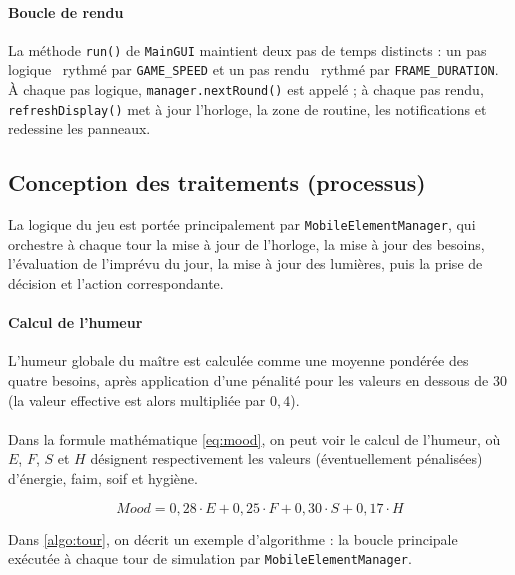 
\paragraph{Boucle de rendu} La méthode \texttt{run()} de \texttt{MainGUI} maintient deux pas de temps distincts : un pas \og logique \fg\ rythmé par \texttt{GAME\_SPEED} et un pas \og rendu \fg\ rythmé par \texttt{FRAME\_DURATION}. À chaque pas logique, \texttt{manager.nextRound()} est appelé ; à chaque pas rendu, \texttt{refreshDisplay()} met à jour l'horloge, la zone de routine, les notifications et redessine les panneaux.

\subsection{Conception des traitements (processus)}

La logique du jeu est portée principalement par \texttt{MobileElementManager}, qui orchestre à chaque tour la mise à jour de l'horloge, la mise à jour des besoins, l'évaluation de l'imprévu du jour, la mise à jour des lumières, puis la prise de décision et l'action correspondante.

\paragraph{Calcul de l'humeur} L'humeur globale du maître est calculée comme une moyenne pondérée des quatre besoins, après application d'une pénalité pour les valeurs en dessous de 30 (la valeur effective est alors multipliée par $0{,}4$).

\paragraph{} Dans la formule mathématique \ref{eq:mood}, on peut voir le calcul de l'humeur, où $E$, $F$, $S$ et $H$ désignent respectivement les valeurs (éventuellement pénalisées) d'énergie, faim, soif et hygiène.

\begin{equation}
\textit{Mood} = 0{,}28 \cdot E + 0{,}25 \cdot F + 0{,}30 \cdot S + 0{,}17 \cdot H
\label{eq:mood}
\end{equation}

Dans \ref{algo:tour}, on décrit un exemple d'algorithme : la boucle principale exécutée à chaque tour de simulation par \texttt{MobileElementManager}.

